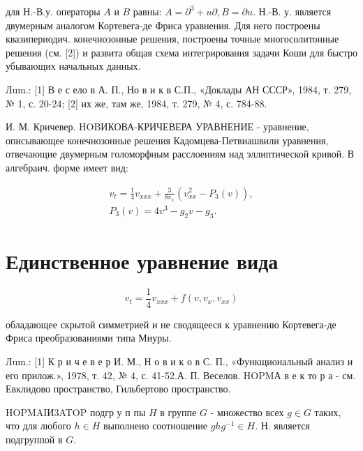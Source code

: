 \documentclass[10pt]{article}
\begin{document}
для Н.-В.у. операторы $A$ и $B$ равны: $A=\partial^{3}+u \partial, B=\partial u$. Н.-В. у. является двумерным аналогом Кортевега-де Фриса уравнения. Для него построены квазипериодич. конечнозонные решения, построены точные многосолитонные решения (см. [2]) и развита общая схема интегрирования задачи Коши для быстро убывающих начальных данных.



Лum.: [1] В е с ело в А. П., Но в и к в С.П., «Доклады АН СССР», 1984, т. 279, № 1, с. 20-24; [2] их же, там же, 1984, т. 279, № 4, с. 784-88.

И. М. Кричевер. HOBИКОВА-КРИЧЕВЕРА УРАВНЕНИЕ - уравнение, описывающее конечнозонные решения Кадомцева-Петвиашвили уравнения, отвечающие двумерным голоморфным расслоениям над эллиптической кривой. В алгебраич. форме имеет вид:



\[

\begin{gathered}

v_{t}=\frac{1}{4} v_{x x x}+\frac{3}{8 v_{x}}\left(v_{x x}^{2}-P_{3}(v)\right), \\

P_{3}(v)=4 v^{3}-g_{2} v-g_{3} .

\end{gathered}

\]



\section{Единственное уравнение вида}

\[

v_{t}=\frac{1}{4} v_{x x x}+f\left(v, v_{x}, v_{x x}\right)

\]



обладающее скрытой симметрией и не сводящееся к уравнению Кортевега-де Фриса преобразованиями типа Миуры.



Лum.: [1] К р и ч е в е р И. М., Н о в и к о в С. П., «Функщиональный анализ и его прилож.», 1978, т. 42, № 4, с. 41-52.А. П. Веселов. HOPMА в е к то р а - см. Евклидово пространство, Гильбертово пространство.



HOPMAIИ3ATOP подгр у п пы $H$ в группе $G$ - множество всех $g \in G$ таких, что для любого $h \in H$ выполнено соотношение $g h g^{-1} \in H$. Н. является подгруппой в $G$.
\end{document}
